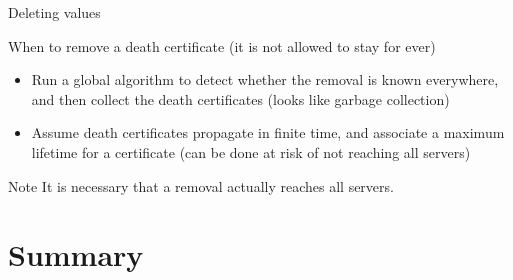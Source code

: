 \begin{slide}{Deleting values}
  \begin{block}{When to remove a death certificate (it is not allowed to stay for ever)}
    \begin{itemize}\tightlist
    \item Run a global algorithm to detect whether the removal is known everywhere, and then collect the death
      certificates (looks like garbage collection)
    \item Assume death certificates propagate in finite time, and associate a maximum lifetime for a
      certificate (can be done at risk of not reaching all servers)
    \end{itemize}
  \end{block}
  \begin{alertblock}{Note} 
    It is necessary that a removal actually reaches all servers.
  \end{alertblock}
\end{slide}
\section{Summary}
